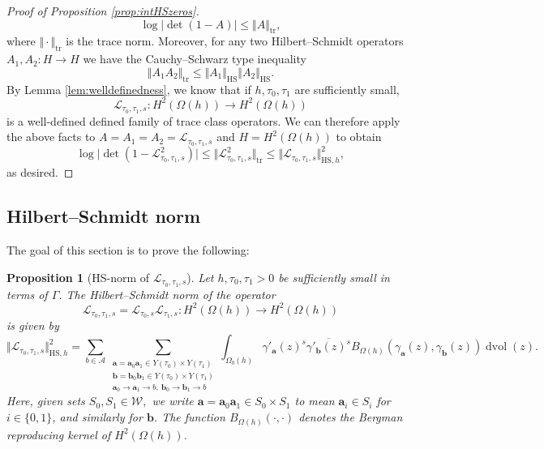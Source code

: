 \documentclass[12pt,letterpaper]{amsart}
\theoremstyle{plain}
\newtheorem{prop}{Proposition}[section]
\theoremstyle{definition}
\theoremstyle{remark}
\newcommand{\Aa}{\textbf{a}}
\newcommand{\Bb}{\textbf{b}}
\DeclareMathOperator{\dvol}{dvol}
\begin{document}
\begin{proof}[Proof of Proposition \ref{prop:intHSzeros}]
\begin{equation}
\log\vert \det\left( 1- A \right) \vert \le  \Vert A\Vert_{\mathrm{tr}},
\end{equation}
where $\Vert \cdot\Vert_{\mathrm{tr}}$ is the trace norm. Moreover, for any two Hilbert--Schmidt operators $A_1,A_2 \colon H \to H$ we have the Cauchy--Schwarz type inequality 
\begin{equation}\label{traceHS}
\Vert A_1 A_2\Vert_{\mathrm{tr}} \le  \Vert A_1 \Vert_{\mathrm{HS}} \Vert A_2\Vert_{\mathrm{HS}}. 
\end{equation}
By Lemma \ref{lem:welldefinedness}, we know that if $h,\tau_0,\tau_1$ are sufficiently small,
$$
\mathcal{L}_{\tau_0,\tau_1,s} \colon H^2(\Omega(h)) \to H^2(\Omega(h)) 
$$
is a well-defined defined family of trace class operators. We can therefore apply the above facts to $A=A_1=A_2 = \mathcal{L}_{\tau_0, \tau_1, s}$ and $H=H^2(\Omega(h))$ to obtain
$$
\log\vert \det( 1- \mathcal{L}_{\tau_0, \tau_1, s}^2) \vert \le   \Vert \mathcal{L}_{\tau_0, \tau_1, s}^2 \Vert_{\mathrm{tr}} \le  \Vert \mathcal{L}_{\tau_0, \tau_1, s} \Vert_{\mathrm{HS},h}^2,
$$
as desired.
\end{proof}


\subsection{Hilbert--Schmidt norm}\label{sec:HSnorm}
The goal of this section is to prove the following:


\begin{prop}[HS-norm of $\mathcal{L}_{\tau_0, \tau_1, s}$]\label{prop:HSnorm}
Let $h,\tau_0, \tau_1 > 0$ be sufficiently small in terms of $\Gamma$. The Hilbert--Schmidt norm of the operator
\[
\mathcal{L}_{\tau_0, \tau_1, s} = \mathcal{L}_{\tau_0, s} \mathcal{L}_{\tau_1, s}\colon H^2(\Omega(h)) \to H^2(\Omega(h))
\]
is given by
\[
\Vert \mathcal{L}_{\tau_0, \tau_1, s} \Vert_{\mathrm{HS},h}^2 = \sum_{b\in \mathcal{A}}  
\sum_{\substack{  
\Aa = \Aa_0\Aa_1 \in Y(\tau_0) \times Y(\tau_1)\\  
\Bb = \Bb_0\Bb_1 \in Y(\tau_0) \times Y(\tau_1) \\  
\Aa_0 \to \Aa_1 \to b,\ \Bb_0 \to \Bb_1 \to b } }  
\int_{\Omega_b(h)} \gamma'_{\Aa}(z)^s \overline{\gamma'_{\Bb}(z)^s}  
B_{\Omega(h)}(\gamma_{\Aa}(z), \gamma_{\Bb}(z)) \dvol(z).
\]
Here, given sets $S_0, S_1 \in \mathcal{W},$ we write $\Aa = \Aa_0\Aa_1 \in S_0 \times S_1$ to mean $\Aa_i \in S_i$ for $i \in \{0,1\}$, and similarly for $\Bb$. The function $B_{\Omega(h)}(\cdot,\cdot)$ denotes the Bergman reproducing kernel of $H^2(\Omega(h))$.
\end{prop}
\end{document}
